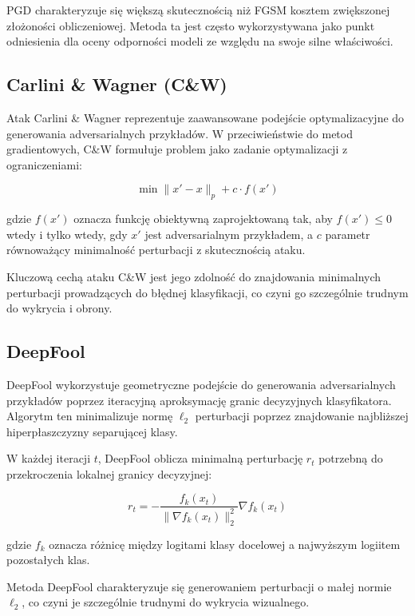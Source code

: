 \documentclass[12pt]{article}
\begin{document}
PGD charakteryzuje się większą skutecznością niż FGSM kosztem zwiększonej złożoności obliczeniowej. Metoda ta jest często wykorzystywana jako punkt odniesienia dla oceny odporności modeli ze względu na swoje silne właściwości.

\subsection{Carlini \& Wagner (C\&W)}

Atak Carlini \& Wagner \cite{carlini2017towards} reprezentuje zaawansowane podejście optymalizacyjne do generowania adversarialnych przykładów. W przeciwieństwie do metod gradientowych, C\&W formułuje problem jako zadanie optymalizacji z ograniczeniami:

\begin{equation}
    \min \|x' - x\|_p + c \cdot f(x')
\end{equation}

gdzie $f(x')$ oznacza funkcję obiektywną zaprojektowaną tak, aby $f(x') \leq 0$ wtedy i tylko wtedy, gdy $x'$ jest adversarialnym przykładem, a $c$ parametr równoważący minimalność perturbacji z skutecznością ataku.

Kluczową cechą ataku C\&W jest jego zdolność do znajdowania minimalnych perturbacji prowadzących do błędnej klasyfikacji, co czyni go szczególnie trudnym do wykrycia i obrony.

\subsection{DeepFool}

DeepFool \cite{moosavi2016deepfool} wykorzystuje geometryczne podejście do generowania adversarialnych przykładów poprzez iteracyjną aproksymację granic decyzyjnych klasyfikatora. Algorytm ten minimalizuje normę $\ell_2$ perturbacji poprzez znajdowanie najbliższej hiperpłaszczyzny separującej klasy.

W każdej iteracji $t$, DeepFool oblicza minimalną perturbację $r_t$ potrzebną do przekroczenia lokalnej granicy decyzyjnej:

\begin{equation}
    r_t = -\frac{f_k(x_t)}{\|\nabla f_k(x_t)\|_2^2} \nabla f_k(x_t)
\end{equation}

gdzie $f_k$ oznacza różnicę między logitami klasy docelowej a najwyższym logiitem pozostałych klas.

Metoda DeepFool charakteryzuje się generowaniem perturbacji o małej normie $\ell_2$, co czyni je szczególnie trudnymi do wykrycia wizualnego.
\end{document}
